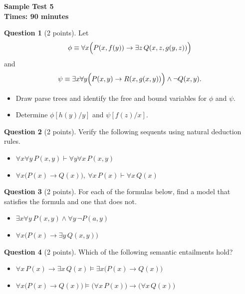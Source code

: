 \documentclass[12pt]{article}
\begin{document}
\begin{center}
    \textbf{Sample Test 5} \\
    \textbf{Times: 90 minutes}
\end{center}

\vspace{0.3cm}

\noindent\textbf{Question 1} (2 points). Let
\[
\phi \equiv \forall x \Bigl( P(x, f(y)) \rightarrow \exists z\, Q(x, z, g(y, z)) \Bigr)
\]
and
\[
\psi \equiv \exists x \forall y \Bigl( P(x, y) \rightarrow R(x, g(x, y)) \Bigr) \wedge \neg Q(x, y).
\]
\begin{itemize}
    \item[a)] Draw parse trees and identify the free and bound variables for $\phi$ and $\psi$.
    \item[b)] Determine $\phi[h(y)/y]$ and $\psi[f(z)/x]$.
\end{itemize}

\vspace{0.2cm}

\noindent\textbf{Question 2} (2 points). Verify the following sequents using natural deduction rules.
\begin{itemize}
    \item[a)] $\forall x \forall y\, P(x, y) \vdash \forall y \forall x\, P(x, y)$
    \item[b)] $\forall x \bigl( P(x) \rightarrow Q(x) \bigr),\ \forall x\, P(x) \vdash \forall x\, Q(x)$
\end{itemize}

\vspace{0.2cm}

\noindent\textbf{Question 3} (2 points). For each of the formulas below, find a model that satisfies the formula and one that does not.
\begin{itemize}
    \item[a)] $\exists x \forall y\, P(x, y) \wedge \forall y\, \neg P(a, y)$
    \item[b)] $\forall x \bigl( P(x) \rightarrow \exists y\, Q(x, y) \bigr)$
\end{itemize}

\vspace{0.2cm}

\noindent\textbf{Question 4} (2 points). Which of the following semantic entailments hold?
\begin{itemize}
    \item[a)] $\forall x\, P(x) \rightarrow \exists x\, Q(x) \models \exists x \bigl( P(x) \rightarrow Q(x) \bigr)$
    \item[b)] $\forall x \bigl( P(x) \rightarrow Q(x) \bigr) \models \bigl( \forall x\, P(x) \bigr) \rightarrow \bigl( \forall x\, Q(x) \bigr)$
\end{itemize}
\end{document}
